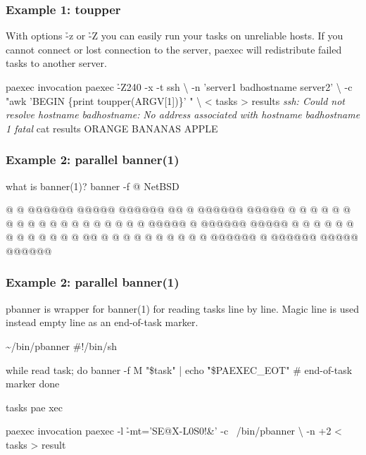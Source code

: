 \documentclass[hyperref={colorlinks=true}]{beamer}
\begin{document}
\begin{frame}[fragile]
  \frametitle{Example 1: toupper}
With options \h{-z} or \h{-Z} you can easily run your tasks on
unreliable hosts. If you cannot connect or lost connection to the
server, paexec will redistribute failed tasks to another server.
  \begin{block}{}
      \begin{CodeLarge}{paexec invocation}
\prompt{\$} paexec \h{-Z}240 -x -t ssh \textbackslash
-n 'server1 badhostname server2' \textbackslash
-c "awk 'BEGIN \{print toupper(ARGV[1])\}' " \textbackslash
    < tasks > results
{\it ssh: Could not resolve hostname badhostname:}
{\it  No address associated with hostname}
{\it  badhostname 1 fatal}
\prompt{\$} cat results
ORANGE
BANANAS
APPLE
\prompt{\$}
      \end{CodeLarge}
  \end{block}
\end{frame}


\linespread{0.5}
\begin{frame}[fragile]
  \frametitle{Example 2: parallel banner(1)}

  \begin{block}{}
      \begin{CodeLarge}{what is banner(1)?}
\prompt{\$} banner -f @ NetBSD

@     @                 @@@@@@   @@@@@  @@@@@@
@@    @  @@@@@@   @@@@@ @     @ @     @ @     @
@ @   @  @          @   @     @ @       @     @
@  @  @  @@@@@      @   @@@@@@   @@@@@  @     @
@   @ @  @          @   @     @       @ @     @
@    @@  @          @   @     @ @     @ @     @
@     @  @@@@@@     @   @@@@@@   @@@@@  @@@@@@


\prompt{\$}
      \end{CodeLarge}
  \end{block}
\end{frame}
\linespread{1}

\begin{frame}[fragile]
  \frametitle{Example 2: parallel banner(1)}
pbanner is wrapper for banner(1) for reading tasks line by line.
Magic line is used instead empty line as an end-of-task marker.
  \begin{block}{}
      \begin{Code}{\~{}/bin/pbanner}
#!/bin/sh

while read task; do
   banner -f M "\$task" |
   echo \h{"\$PAEXEC\_EOT"} # end-of-task marker
done
      \end{Code}
      \begin{Code}{tasks}
pae
xec
      \end{Code}

      \begin{Code}{paexec invocation}
\prompt{\$} paexec -l \h{-mt='SE@X-L0S0!&'} -c ~/bin/pbanner \textbackslash
   -n +2 < tasks > result
\prompt{\$}
      \end{Code}
  \end{block}
\end{frame}
\end{document}
